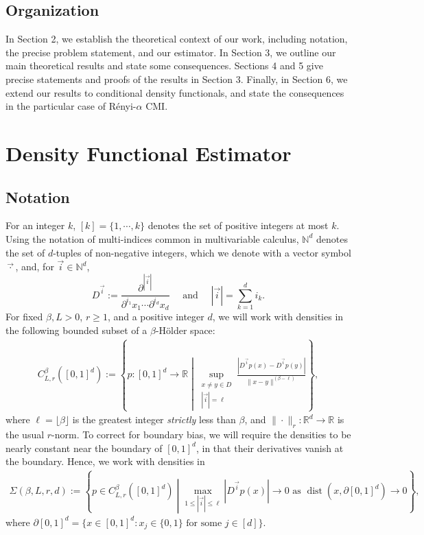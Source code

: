 \documentclass{article} %
\newcommand{\N}{\mathbb{N}}                         %
\newcommand{\R}{\mathbb{R}}                         %
\newcommand{\vi}{{\vec{i}}}                         %
\newcommand{\dist}{\operatorname{dist}}             %
\begin{document}
\subsection*{Organization}
In Section 2, we establish the theoretical context of our work, including
notation, the precise problem statement, and our estimator. In Section 3, we
outline our main theoretical results and state some consequences. Sections 4
and 5 give precise statements and proofs of the results in Section 3. Finally,
in Section 6, we extend our results to conditional density functionals,
and state the consequences in the particular case of R\'enyi-$\alpha$ CMI.

\section{Density Functional Estimator}
\subsection{Notation}
For an integer $k$, $[k] = \{1,\cdots,k\}$ denotes the set of positive integers
at most $k$. Using the notation of multi-indices common in multivariable
calculus, $\N^d$ denotes the set of $d$-tuples of non-negative integers, which
we denote with a vector symbol $\vec\cdot$, and, for $\vi \in \N^d$,
\[D^\vi := \frac{\partial^{|\vi|}}{\partial^{i_1}x_1\cdots\partial^{i_d}x_d}
    \quad \mbox{ and } \quad
    |\vi| = \sum_{k = 1}^d i_k.
\]
For fixed $\beta, L > 0$, $r \geq 1$, and a positive integer $d$, we will work
with densities in the following bounded subset of a $\beta$-H\"older space:
\begin{align}
C_{L,r}^\beta([0,1]^d)
    := \left\{ p : [0,1]^d \to \R \middle|
            \sup_{\substack{x \neq y \in D\\|\vi| = \ell}}
            \frac{|D^\vi p(x) - D^\vi p(y)|}{\|x - y\|^{(\beta - \ell)}}
    \right\},
\label{eq:holder}
\end{align}
where $\ell = \lfloor \beta \rfloor$ is the greatest integer \emph{strictly}
less than $\beta$, and $\|\cdot\|_r : \R^d \to \R$ is the usual $r$-norm. To
correct for boundary bias, we will require the densities to be nearly constant
near the boundary of $[0,1]^d$, in that their derivatives vanish at the
boundary. Hence, we work with densities in
\begin{align}
\Sigma(\beta,L,r,d)
    := \left\{ p \in C_{L,r}^\beta([0,1]^d) \middle|
            \max_{1 \leq |\vi| \leq \ell} |D^\vi p(x)| \to 0
            \mbox{ as }
            \dist(x,\partial[0,1]^d) \to 0
    \right\},
\label{eq:bdd_holder}
\end{align}
where
$\partial[0,1]^d = \{x \in [0,1]^d : x_j \in \{0,1\}
    \mbox{ for some } j \in [d]\}$.
\end{document}

